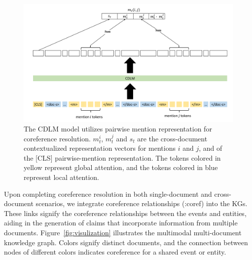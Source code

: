 \begin{figure}
\centering\includegraphics[width=\textwidth,height=\textwidth,keepaspectratio]{images/CDLM.pdf}
  \caption{The CDLM model utilizes pairwise mention representation for coreference resolution. $m_t^i$, $m_t^j$ and $s_t$ are the cross-document contextualized representation vectors for mentions $i$ and $j$, and of the [CLS] pairwise-mention representation. The tokens colored in yellow represent global attention, and the tokens colored in blue represent local attention.}
  \label{fig:cdlm}
\end{figure}

Upon completing coreference resolution in both single-document and cross-document scenarios, we integrate coreference relationships (:coref) into the KGs. These links signify the coreference relationships between the events and entities, aiding in the generation of claims that incorporate information from multiple documents. Figure~\ref{fig:visulization} illustrates the multimodal multi-document knowledge graph. Colors signify distinct documents, and the connection between nodes of different colors indicates coreference for a shared event or entity.

